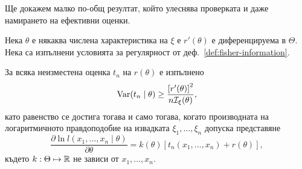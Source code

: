 \documentclass[numbers=endperiod, DIV=15, bibliography=totocnumbered]{scrartcl}
\begin{document}
Ще докажем малко по-общ резултат, който улеснява проверката и даже намирането на ефективни оценки.
\begin{theorem}\label{thm:rao-cramer}
  Нека $\theta$ е някаква числена характеристика на $\xi$ е $r'(\theta)$ е диференцируема в $\Theta$. Нека са изпълнени условията за регулярност от деф.~\ref{def:fisher-information}.

  За всяка неизместена оценка $t_n$ на $r(\theta)$ е изпълнено
  \begin{displaymath}
    \operatorname{Var}(t_n \mid \theta) \geq \frac {{\left[r'(\theta) \right]}^2} {n \mathcal{I}_\xi(\theta)},
  \end{displaymath}
  като равенство се достига тогава и само тогава, когато производната на логаритмичното правдоподобие на извадката $\xi_1, \ldots, \xi_n$ допуска представяне
  \begin{displaymath}
    \frac {\partial \ln l(x_1, \ldots, x_n \mid \theta)} {\partial \theta}
    =
    k(\theta) [t_n(x_1, \ldots, x_n) + r(\theta)],
  \end{displaymath}
  където $k: \Theta \mapsto \mathbb{R}$ не зависи от $x_1, \ldots, x_n$.
\end{theorem}
\end{document}
